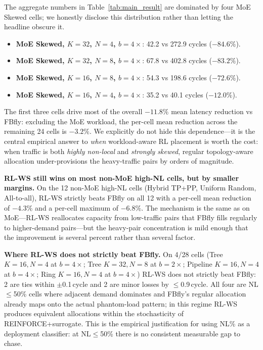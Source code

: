 \documentclass[conference]{IEEEtran}
\begin{document}
The aggregate numbers in Table~\ref{tab:main_result} are dominated by four MoE Skewed cells; we honestly disclose this distribution rather than letting the headline obscure it.
\begin{itemize}
\item \textbf{MoE Skewed, $K{=}32$, $N{=}4$, $b{=}4\times$}: 42.2 vs 272.9 cycles ($-84.6\%$).
\item \textbf{MoE Skewed, $K{=}32$, $N{=}8$, $b{=}4\times$}: 67.8 vs 402.8 cycles ($-83.2\%$).
\item \textbf{MoE Skewed, $K{=}16$, $N{=}8$, $b{=}4\times$}: 54.3 vs 198.6 cycles ($-72.6\%$).
\item \textbf{MoE Skewed, $K{=}16$, $N{=}4$, $b{=}4\times$}: 35.2 vs 40.1 cycles ($-12.0\%$).
\end{itemize}
The first three cells drive most of the overall $-11.8\%$ mean latency reduction vs FBfly: excluding the MoE workload, the per-cell mean reduction across the remaining 24 cells is $-3.2\%$. We explicitly do not hide this dependence---it is the central empirical answer to \textit{when} workload-aware RL placement is worth the cost: when traffic is both \textit{highly non-local} and \textit{strongly skewed}, regular topology-aware allocation under-provisions the heavy-traffic pairs by orders of magnitude.

\textbf{RL-WS still wins on most non-MoE high-NL cells, but by smaller margins.} On the 12 non-MoE high-NL cells (Hybrid TP+PP, Uniform Random, All-to-all), RL-WS strictly beats FBfly on all 12 with a per-cell mean reduction of $-4.3\%$ and a per-cell maximum of $-6.8\%$. The mechanism is the same as on MoE---RL-WS reallocates capacity from low-traffic pairs that FBfly fills regularly to higher-demand pairs---but the heavy-pair concentration is mild enough that the improvement is several percent rather than several factor.

\textbf{Where RL-WS does not strictly beat FBfly.} On 4/28 cells (Tree $K{=}16, N{=}4$ at $b{=}4\times$; Tree $K{=}32, N{=}8$ at $b{=}2\times$; Pipeline $K{=}16, N{=}4$ at $b{=}4\times$; Ring $K{=}16, N{=}4$ at $b{=}4\times$) RL-WS does not strictly beat FBfly: 2 are ties within $\pm$0.1\,cycle and 2 are minor losses by $\le$0.9\,cycle. All four are NL$\le$50\% cells where adjacent demand dominates and FBfly's regular allocation already maps onto the actual phantom-load pattern; in this regime RL-WS produces equivalent allocations within the stochasticity of REINFORCE+surrogate. This is the empirical justification for using NL\% as a deployment classifier: at NL$\le$50\% there is no consistent measurable gap to chase.
\end{document}
